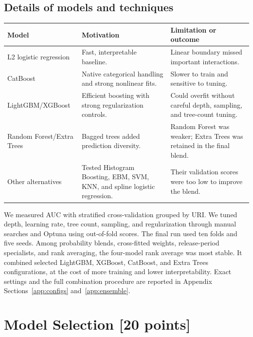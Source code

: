\documentclass{article}
\begin{document}
\subsection{Details of models and techniques}
\begin{center}
\footnotesize
\setlength{\tabcolsep}{5pt}
\renewcommand{\arraystretch}{1.02}
\begin{tabularx}{\textwidth}{@{}>{\raggedright\arraybackslash}p{}
  >{\raggedright\arraybackslash}p{}
  >{\raggedright\arraybackslash}X@{}}
\toprule
\textbf{Model} & \textbf{Motivation} & \textbf{Limitation or outcome} \\
\midrule
L2 logistic regression & Fast, interpretable baseline. & Linear boundary
missed important interactions. \\
CatBoost & Native categorical handling and strong nonlinear fits. & Slower to
train and sensitive to tuning. \\
LightGBM/XGBoost & Efficient boosting with strong regularization controls. &
Could overfit without careful depth, sampling, and tree-count tuning. \\
Random Forest/Extra Trees & Bagged trees added prediction diversity. & Random
Forest was weaker; Extra Trees was retained in the final blend. \\
Other alternatives & Tested Histogram Boosting, EBM, SVM, KNN, and spline
logistic regression. & Their validation scores were too low to improve the
blend. \\
\bottomrule
\end{tabularx}
\end{center}

We measured AUC with stratified cross-validation grouped by URI. We tuned
depth, learning rate, tree count, sampling, and regularization through manual
searches and Optuna using out-of-fold scores. The final run used ten folds and
five seeds. Among probability blends, cross-fitted weights, release-period
specialists, and rank averaging, the four-model rank average was most stable.
It combined selected LightGBM, XGBoost, CatBoost, and Extra Trees
configurations, at the cost of more training and lower interpretability.
Exact settings and the full combination procedure are reported in Appendix
Sections~\ref{app:configs} and~\ref{app:ensemble}.

\newpage

\section{Model Selection [20 points]}
\end{document}
